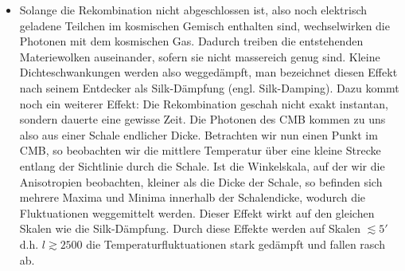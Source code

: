 \documentclass[10pt,a4paper]{article}
\begin{document}
\begin{itemize}
\item Solange die Rekombination nicht abgeschlossen ist, also noch elektrisch geladene Teilchen im kosmischen Gemisch enthalten sind, wechselwirken die Photonen mit dem kosmischen Gas. Dadurch treiben die entstehenden Materiewolken auseinander, sofern sie nicht massereich genug sind. Kleine Dichteschwankungen werden also weggedämpft, man bezeichnet diesen Effekt nach seinem Entdecker als Silk-Dämpfung (engl. Silk-Damping).\cite{A+R} Dazu kommt noch ein weiterer Effekt: Die Rekombination geschah nicht exakt instantan, sondern dauerte eine gewisse Zeit. Die Photonen des CMB kommen zu uns also aus einer Schale endlicher Dicke. Betrachten wir nun einen Punkt im CMB, so beobachten wir die mittlere Temperatur über eine kleine Strecke entlang der Sichtlinie durch die Schale. Ist die Winkelskala, auf der wir die Anisotropien beobachten, kleiner als die Dicke der Schale, so befinden sich mehrere Maxima und Minima innerhalb der Schalendicke, wodurch die Fluktuationen weggemittelt werden. Dieser Effekt wirkt auf den gleichen Skalen wie die Silk-Dämpfung. Durch diese Effekte werden auf Skalen $\lesssim 5'$ d.h. $l\gtrsim2500$ die Temperaturfluktuationen stark gedämpft und fallen rasch ab.\cite{Schneider}
\end{itemize}
\end{document}
